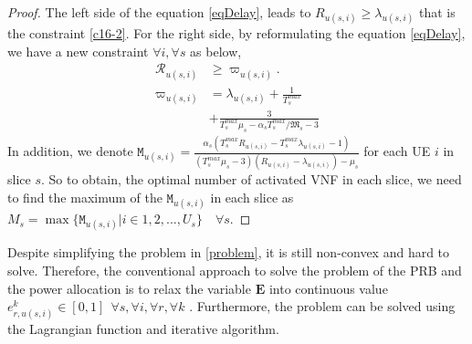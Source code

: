 \documentclass[lettersize,journal]{IEEEtran}
\begin{document}
\begin{proof}
The left side of the equation \eqref{eqDelay}, leads to $R_{u(s,i)} \geq \lambda_{u(s,i)}$ that is the constraint \eqref{c16-2}. 
For the right side, by reformulating the equation \eqref{eqDelay}, we have a new constraint $\forall i, \forall s$ as below,
\begin{subequations}\label{RM}
\begin{alignat}{4}
\mathcal{R}_{u(s,i)} &\geq \varpi_{u(s,i)}. \\
\varpi_{u(s,i)} &= \lambda_{u(s,i)} + \frac{1}{T^{max}_s}\\
& + \frac{3}{T^{max}_s\mu_s-\alpha_s T^{max}_s/\mathfrak{M}_s-3}
\end{alignat}
\end{subequations}
In addition, we denote $\mathtt{M}_{u(s,i)} = \frac{\alpha_s(T^{max}_s R_{u(s,i)}-T^{max}_s\lambda_{u(s,i)} -1)}{(T^{max}_s\mu_s-3)(R_{u(s,i)}-\lambda_{u(s,i)}) - \mu_s }$ for each UE $i$ in slice $s$.
So to obtain, the optimal number of activated VNF in each slice, we need to find the maximum of the
$\mathtt{M}_{u(s,i)}$ in each slice as $M_s = \max\{\mathtt{M}_{u(s,i)} | i \in 1,2,..., U_s\} \quad \forall s $.
\end{proof}
Despite simplifying the problem in \eqref{problem}, it is still non-convex and hard to solve.
Therefore, the conventional approach to solve the problem of the PRB and the power allocation is to relax the variable $\mathbf{E}$ into continuous value $e_{r,u(s,i)}^k \in [0,1] \:\: \forall s , \forall i ,\forall r, \forall k$ \cite{lee2018dynamic,ali2018joint}.
Furthermore, the problem can be solved using the Lagrangian function and iterative algorithm.
\end{document}
